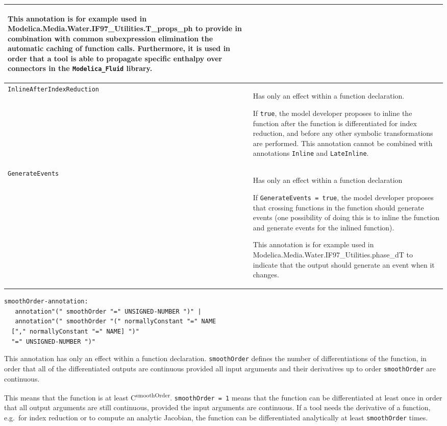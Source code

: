 \begin{longtable}[]{|p{4.2cm}|p{10cm}|}
\begin{nonnormative}
This annotation is for example used in
Modelica\allowbreak{}.Media\allowbreak{}.Water\allowbreak{}.IF97\_Utilities\allowbreak{}.T\_props\_ph to provide in
combination with common subexpression elimination the automatic caching
of function calls. Furthermore, it is used in order that a tool is able
to propagate specific enthalpy over connectors in the \lstinline!Modelica_Fluid!
library.
\end{nonnormative}
\\ \hline
\lstinline!InlineAfterIndexReduction!\strut
&
Has only an effect within a function declaration.

If \lstinline!true!, the model developer proposes to inline the function after the
function is differentiated for index reduction, and before any other
symbolic transformations are performed. This annotation cannot be
combined with annotations \lstinline!Inline! and \lstinline!LateInline!.
\\ \hline
\lstinline!GenerateEvents!\strut
&
Has only an effect within a function declaration

If \lstinline!GenerateEvents = true!, the model developer proposes that crossing
functions in the function should generate events (one possibility of
doing this is to inline the function and generate events for the inlined
function).

\begin{nonnormative}
This annotation is for example used in
Modelica\allowbreak{}.Media\allowbreak{}.Water\allowbreak{}.IF97\_Utilities.phase\_dT to indicate that
the output should generate an event when it changes.
\end{nonnormative}
\\ \hline
\end{longtable}
\begin{lstlisting}[language=grammar]
smoothOrder-annotation:
   annotation"(" smoothOrder "=" UNSIGNED-NUMBER ")" |
   annotation"(" smoothOrder "(" normallyConstant "=" NAME
  ["," normallyConstant "=" NAME] ")"
  "=" UNSIGNED-NUMBER ")"
\end{lstlisting}
This annotation has only an effect within a function declaration.
\lstinline!smoothOrder! defines the number of differentiations of the function, in
order that all of the differentiated outputs are continuous provided all
input arguments and their derivatives up to order \lstinline!smoothOrder! are
continuous.

\begin{nonnormative}
This means that the function is at least C\textsuperscript{smoothOrder}.  \lstinline!smoothOrder = 1! means that
the function can be differentiated at least once in order that all output arguments are still continuous, provided
the input arguments are continuous.  If a tool needs the derivative of a function, e.g.\ for index reduction or to
compute an analytic Jacobian, the function can be differentiated analytically at least \lstinline!smoothOrder! times.
\end{nonnormative}

